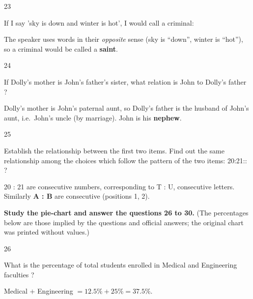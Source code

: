 \begin{question}{23}
{If I say 'sky is down and winter is hot', I would call a criminal:\par}
\begin{explain}
The speaker uses words in their \emph{opposite} sense (sky is ``down'', winter is ``hot''), so a criminal would be called a \textbf{saint}.
\end{explain}
\end{question}

\begin{question}{24}
{If Dolly's mother is John's father's sister, what relation is John to Dolly's father ?\par}
\begin{explain}
Dolly's mother is John's paternal aunt, so Dolly's father is the husband of John's aunt, i.e.\ John's uncle (by marriage). John is his \textbf{nephew}.
\end{explain}
\end{question}

\begin{question}{25}
{Establish the relationship between the first two items. Find out the same relationship among the choices which follow the pattern of the two items: 20:21:: ?\par}
\begin{explain}
20 : 21 are consecutive numbers, corresponding to T : U, consecutive letters. Similarly \textbf{A : B} are consecutive (positions 1, 2).
\end{explain}
\end{question}

\begin{context}
\textbf{Study the pie-chart and answer the questions 26 to 30.} (The percentages below are those implied by the questions and official answers; the original chart was printed without values.)
\begin{center}
\end{center}
\end{context}
\begin{question}{26}
{What is the percentage of total students enrolled in Medical and Engineering faculties ?\par}
\begin{explain}
Medical $+$ Engineering $=12.5\%+25\%=\mathbf{37.5\%}$.
\end{explain}
\end{question}

